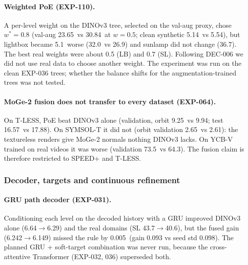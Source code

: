 \paragraph{Weighted PoE (EXP-110).}
A per-level weight on the DINOv3 tree, selected on the val-aug proxy, chose $w^*=0.8$ (val-aug 23.65\appDdeg\ vs 30.84\appDdeg\ at $w=0.5$; clean synthetic 5.14\appDdeg\ vs 5.54\appDdeg), but lightbox became 5.1\appDdeg\ worse (32.0\appDdeg\ vs 26.9\appDdeg) and sunlamp did not change (36.7\appDdeg). The best real weights were about 0.5 (LB) and 0.7 (SL). Following DEC-006 we did not use real data to choose another weight. The experiment was run on the clean EXP-036 trees; whether the balance shifts for the augmentation-trained trees was not tested.

\paragraph{MoGe-2 fusion does not transfer to every dataset (EXP-064).}
On T-LESS, PoE beat DINOv3 alone (validation, orbit 9.25\appDdeg\ vs 9.94\appDdeg; test 16.57\appDdeg\ vs 17.88\appDdeg). On SYMSOL-T it did not (orbit validation 2.65\appDdeg\ vs 2.61\appDdeg): the textureless renders give MoGe-2 normals nothing DINOv3 lacks. On YCB-V trained on real videos it was worse (validation 73.5\appDdeg\ vs 64.3\appDdeg). The fusion claim is therefore restricted to SPEED+ and T-LESS.

\subsubsection{Decoder, targets and continuous refinement}\label{app:log_neg_dec}

\paragraph{GRU path decoder (EXP-031).}
Conditioning each level on the decoded history with a GRU improved DINOv3 alone (6.64\appDdeg$\to$6.29\appDdeg) and the real domains (SL 43.7\appDdeg$\to$40.6\appDdeg), but the fused gain (6.242\appDdeg$\to$6.149\appDdeg) missed the rule by 0.005\appDdeg\ (gain 0.093 vs seed std 0.098). The planned GRU + soft-target combination was never run, because the cross-attentive Transformer (EXP-032, 036) superseded both.

